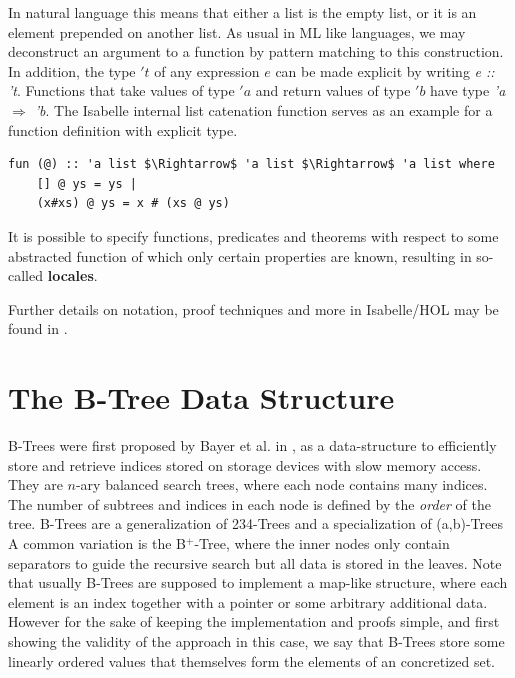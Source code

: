 In natural language this means that either a list is the empty list,
or it is an element prepended on another list.
As usual in ML like languages, we may deconstruct an argument to a function
by pattern matching to this construction.
In addition, the type $'t$ of any expression $e$ can be
made explicit by writing \textit{e :: 't}.
Functions that take values of type $'a$ and return values of type $'b$ 
have type \textit{'a $\Rightarrow$ 'b}.
The Isabelle internal list catenation function serves as
an example for a function definition with explicit type.

\begin{lstlisting}[mathescape=true, language=Isabelle,label=lst:append-def]
fun (@) :: 'a list $\Rightarrow$ 'a list $\Rightarrow$ 'a list where
    [] @ ys = ys |
    (x#xs) @ ys = x # (xs @ ys)
\end{lstlisting}

It is possible to specify functions, predicates
and theorems with respect to some abstracted function
of which only certain properties are known,
resulting in so-called \textbf{locales}.

Further details on notation, proof techniques and more in Isabelle/HOL
may be found in \parencite{DBLP:books/sp/NipkowPW02}.


\section{The B-Tree Data Structure}

B-Trees were first proposed by Bayer et al. in \parencite{DBLP:journals/acta/BayerM72},
as a data-structure to efficiently store and retrieve indices stored on storage devices
with slow memory access.
They are $n$-ary balanced search trees, where each
node contains many indices.
The number of subtrees and indices in each node is
defined by the \textit{order} of the tree.
B-Trees are a generalization of 234-Trees and a specialization of (a,b)-Trees
A common variation is the B$^+$-Tree, where the inner nodes
only contain separators to guide the recursive search
but all data is stored in the leaves. \parencite{DBLP:journals/csur/Comer79}
Note that usually B-Trees are supposed to implement a map-like
structure, where each element is an index together with a pointer
or some arbitrary additional data.
However for the sake of keeping the implementation and proofs simple,
and first showing the validity of the approach in this case,
we say that B-Trees store some linearly ordered values
that themselves form the elements of an concretized set.

